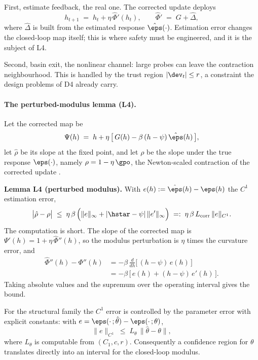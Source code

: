 First, estimate feedback, the real one. The corrected update deploys
\begin{equation*}
h_{t+1} \;=\; h_t + \eta\,\hat\Phi'(h_t),
\qquad
\hat\Phi' \;=\; G + \hat\Delta ,
\end{equation*}
where $\hat\Delta$ is built from the estimated response
$\hat\eps(\cdot)$. Estimation error changes the closed-loop map itself;
this is where safety must be engineered, and it is the subject of L4.

Second, basin exit, the nonlinear channel: large probes can leave the
contraction neighbourhood. This is handled by the trust region
$|\dev_t| \le r$, a constraint the design problems of D4 already carry.

\paragraph{The perturbed-modulus lemma (L4).}
Let the corrected map be
\begin{equation*}
\Psi(h) \;=\; h + \eta\,\big[\,G(h) - \beta\,(h-\psi)\,\hat\eps(h)\,\big],
\end{equation*}
let $\hat\rho$ be its slope at the fixed point, and let $\rho$ be the
slope under the true response $\eps(\cdot)$, namely
$\rho = 1 - \eta\,\gpo$, the Newton-scaled contraction of the corrected
update \citep{reflex2026}.

\textbf{Lemma L4 (perturbed modulus).} With
$e(h) := \hat\eps(h) - \eps(h)$ the $C^1$ estimation error,
\begin{equation*}
\big|\hat\rho - \rho\big|
\;\le\;
\eta\,\beta\,\Big( \|e\|_\infty + |\hstar - \psi|\,\|e'\|_\infty \Big)
\;=:\;
\eta\,\beta\,L_{\mathrm{corr}}\,\|e\|_{C^1} .
\end{equation*}
The computation is short. The slope of the corrected map is
$\Psi'(h) = 1 + \eta\,\hat\Phi''(h)$, so the modulus perturbation is
$\eta$ times the curvature error, and
\begin{align*}
\hat\Phi''(h) - \Phi''(h)
&= -\beta\,\frac{d}{dh}\Big[\,(h-\psi)\,e(h)\,\Big] \\
&= -\beta\,\Big[\, e(h) + (h-\psi)\,e'(h) \,\Big].
\end{align*}
Taking absolute values and the supremum over the operating interval gives
the bound.

For the structural family the $C^1$ error is controlled by the parameter
error with explicit constants: with
$e = \eps(\cdot\,;\hat\theta) - \eps(\cdot\,;\theta)$,
\begin{equation*}
\|e\|_{C^1} \;\le\; L_\theta\,\|\hat\theta - \theta\| ,
\end{equation*}
where $L_\theta$ is computable from $(C_1, c, r)$. Consequently a confidence
region for $\theta$ translates directly into an interval for the
closed-loop modulus.

